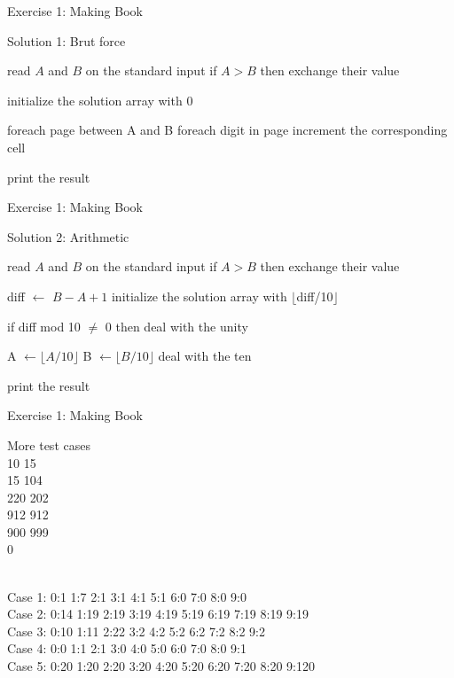 \documentclass{beamer}
\begin{document}
\begin{frame}[fragile]{Exercise 1: Making Book}

  \begin{code}{Solution 1: Brut force}
    \begin{PseudoCode}
read $A$ and $B$ on the standard input
if $A > B$ then 
    exchange their value

initialize the solution array with 0

foreach page between A and B
    foreach digit in page
        increment the corresponding cell

print the result
    \end{PseudoCode}
  \end{code}
\end{frame}

\begin{frame}[fragile]{Exercise 1: Making Book}
  
  \begin{code}{Solution 2: Arithmetic}
    \begin{PseudoCode}
read $A$ and $B$ on the standard input
if $A > B$ then exchange their value

diff $\leftarrow$ $B - A + 1$
initialize the solution array with $\lfloor$diff/10$\rfloor$
    
if diff mod 10 $\neq$ 0 then
    deal with the unity
    
A $\leftarrow \lfloor A / 10 \rfloor$
B $\leftarrow \lfloor B / 10 \rfloor$
deal with the ten

print the result
    \end{PseudoCode}
  \end{code}
\end{frame}

\begin{frame}{Exercise 1: Making Book}

  \begin{exampleblock}{More test cases}
    \\
    10 15\\
    15 104\\
    220 202\\
    912 912\\
    900 999\\
    0
    
    \medskip
    \\
    Case 1: 0:1 1:7 2:1 3:1 4:1 5:1 6:0 7:0 8:0 9:0\\
    Case 2: 0:14 1:19 2:19 3:19 4:19 5:19 6:19 7:19 8:19 9:19\\
    Case 3: 0:10 1:11 2:22 3:2 4:2 5:2 6:2 7:2 8:2 9:2\\
    Case 4: 0:0 1:1 2:1 3:0 4:0 5:0 6:0 7:0 8:0 9:1\\
    Case 5: 0:20 1:20 2:20 3:20 4:20 5:20 6:20 7:20 8:20 9:120
  \end{exampleblock}
\end{frame}
\end{document}
